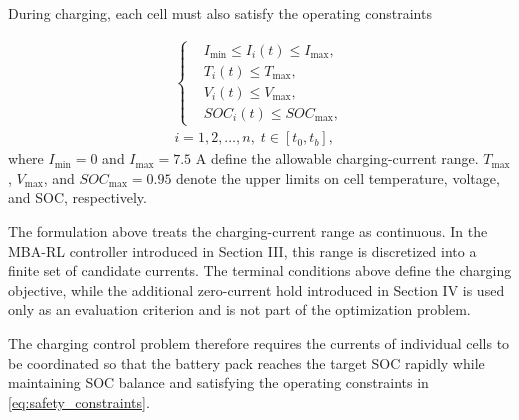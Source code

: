 During charging, each cell must also satisfy the operating constraints

\begin{equation}\label{eq:safety_constraints}
    \begin{gathered}
    \left\{
    \begin{aligned}
    &I_{\min} \leq I_i(t) \leq I_{\max},\\
    &T_i(t) \leq T_{\max},\\ 
    &V_i(t) \leq V_{\max},\\
    &SOC_i(t) \leq SOC_{\max},
    \end{aligned}
    \right.\\[4pt]
    i=1,2,\ldots,n,\;
    t\in[t_0,t_b],
    \end{gathered}
\end{equation}
where $I_{\min}=0$ and $I_{\max}=7.5$ A define the allowable charging-current range.
$T_{\max}$, $V_{\max}$, and $SOC_{\max}=0.95$ denote the upper limits on cell temperature, voltage, and SOC, respectively.

The formulation above treats the charging-current range as continuous. In the MBA-RL controller introduced in Section III, this range is discretized into a finite set of candidate currents. The terminal conditions above define the charging objective, while the additional zero-current hold introduced in Section IV is used only as an evaluation criterion and is not part of the optimization problem.

The charging control problem therefore requires the currents of individual cells to be coordinated so that the battery pack reaches the target SOC rapidly while maintaining SOC balance and satisfying the operating constraints in \eqref{eq:safety_constraints}.
